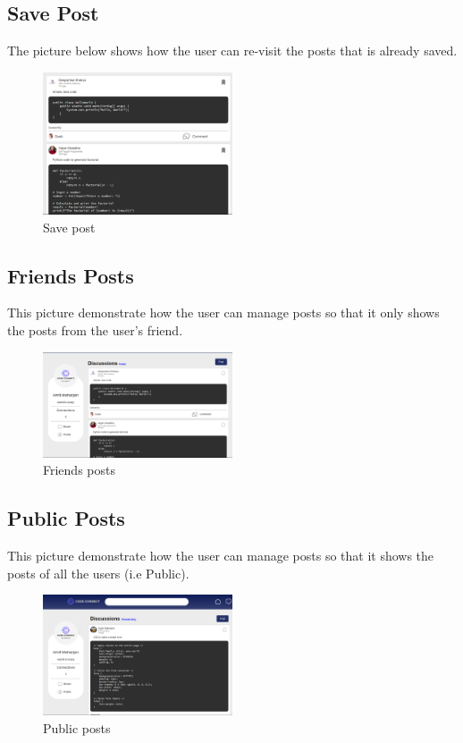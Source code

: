 \subsection{Save Post}
The picture below shows how the user can re-visit the posts that is already saved.
\begin{figure}[H]
    \centering
    \includegraphics[width=0.5\textwidth]{Outcome-ss/saved-posts-list.png}
    \caption{Save post}
    \label{fig:Save Post}
\end{figure}

\subsection{Friends Posts}
This picture demonstrate how the user can manage posts so that it only shows the posts from the user's friend.
\begin{figure}[H]
    \centering
    \includegraphics[width=0.5\textwidth]{Outcome-ss/friends-posts.png}
    \caption{Friends posts}
    \label{fig:Friends posts}
\end{figure}

\subsection{Public Posts}
This picture demonstrate how the user can manage posts so that it shows the posts of all the users (i.e Public).
\begin{figure}[H]
    \centering
    \includegraphics[width=0.5\textwidth]{Outcome-ss/public-posts.png}
    \caption{Public posts}
    \label{fig:Public posts}
\end{figure}

